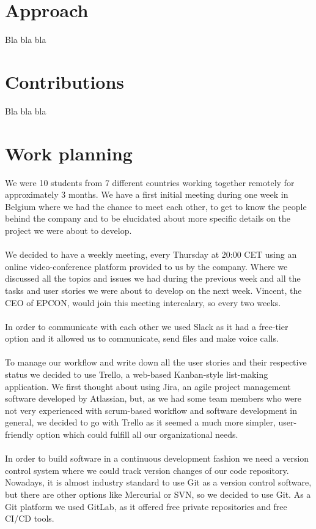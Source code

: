 \section{Approach}

Bla bla bla

\section{Contributions}

Bla bla bla

\section{Work planning}

We were 10 students from 7 different countries working together remotely for approximately 3 months. We have a first initial meeting during one week in Belgium where we had the chance to meet each other, to get to know the people behind the company and to be elucidated about more specific details on the project we were about to develop.
\\ \\
We decided to have a weekly meeting, every Thursday at 20:00 CET using an online video-conference platform provided to us by the company. Where we discussed all the topics and issues we had during the previous week and all the tasks and user stories we were about to develop on the next week. Vincent, the CEO of EPCON, would join this meeting intercalary, so every two weeks.
\\ \\
In order to communicate with each other we used Slack as it had a free-tier option and it allowed us to communicate, send files and make voice calls.
\\ \\
To manage our workflow and write down all the user stories and their respective status we decided to use Trello, a web-based Kanban-style list-making application. \cite{Trello} We first thought about using Jira, an agile project management software developed by Atlassian, but, as we had some team members who were not very experienced with scrum-based workflow and software development in general, we decided to go with Trello as it seemed a much more simpler, user-friendly option which could fulfill all our organizational needs.
\\ \\
In order to build software in a continuous development fashion we need a version control system where we could track version changes of our code repository. Nowadays, it is almost industry standard to use Git as a version control software, but there are other options like Mercurial or SVN, so we decided to use Git. As a Git platform we used GitLab, as it offered free private repositories and free CI/CD tools.

